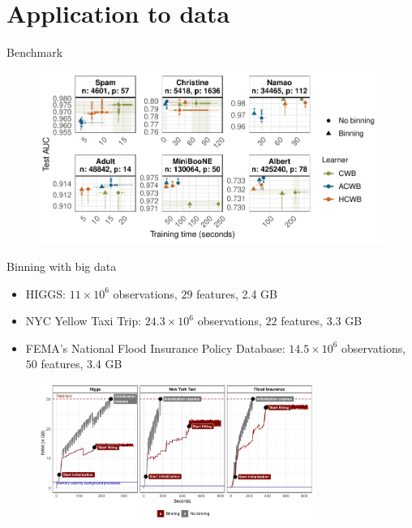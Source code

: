 \documentclass[ignorenonframetext,]{beamer}
\providecommand{\tightlist}{%
  \setlength{\itemsep}{0pt}\setlength{\parskip}{0pt}}
\begin{document}
\hypertarget{application-to-data}{%
\section{Application to data}\label{application-to-data}}

\begin{frame}{Benchmark}
\protect\hypertarget{benchmark}{}
\begin{figure}
\centering
\includegraphics[width=1.1\textwidth]{figures/fig-eq2-2.pdf}
\end{figure}
\end{frame}

\begin{frame}{Binning with big data}
\protect\hypertarget{binning-with-big-data}{}
\begin{itemize}
\tightlist
\item
  HIGGS: \(11 \times 10^6\) observations, \(29\) features, 2.4 GB
\item
  NYC Yellow Taxi Trip: \(24.3 \times 10^6\) observations, \(22\)
  features, 3.3 GB
\item
  FEMA's National Flood Insurance Policy Database: \(14.5 \times 10^6\)
  observations, \(50\) features, 3.4 GB
\end{itemize}

\begin{figure}
\centering
\includegraphics[width=0.8\textwidth]{figures/app-big-data.pdf}
\end{figure}
\end{frame}

\begin{frame}[plain]{}
\protect\hypertarget{section}{}
\end{frame}

\begin{frame}{}
\protect\hypertarget{section-1}{}
\footnotesize


\end{frame}
\end{document}
